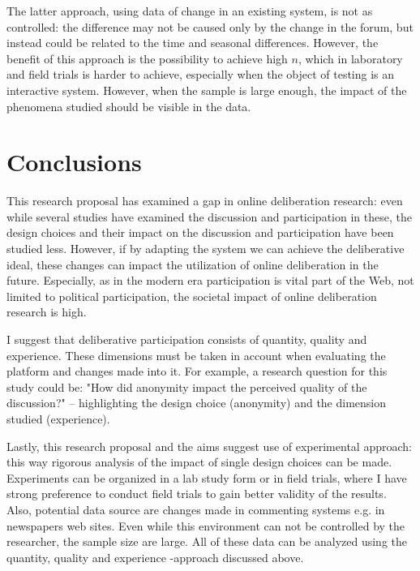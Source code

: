 \documentclass{article}
\begin{document}
The latter approach, using data of change in an existing system, is not as controlled: the difference may not be caused only by the change in the forum, but instead could be related to the time and seasonal differences. However, the benefit of this approach is the possibility to achieve high $n$, which in laboratory and field trials is harder to achieve, especially when the object of testing is an interactive system. However, when the sample is large enough, the impact of the phenomena studied should be visible in the data.

\section{Conclusions}

This research proposal has examined a gap in online deliberation research: even while several studies have examined the discussion and participation in these, the design choices and their impact on the discussion and participation have been studied less. However, if by adapting the system we can achieve the deliberative ideal, these changes can impact the utilization of online deliberation in the future. Especially, as in the modern era participation is vital part of the Web, not limited to political participation, the societal impact of online deliberation research is high.

I suggest that deliberative participation consists of quantity, quality and experience. These dimensions must be taken in account when evaluating the platform and changes made into it. For example, a research question for this study could be: "How did anonymity impact the perceived quality of the discussion?" -- highlighting the design choice (anonymity) and the dimension studied (experience).

Lastly, this research proposal and the aims suggest use of experimental approach: this way rigorous analysis of the impact of single design choices can be made. Experiments can be organized in a lab study form or in field trials, where I have strong preference to conduct field trials to gain better validity of the results. Also, potential data source are changes made in commenting systems e.g. in newspapers web sites. Even while this environment can not be controlled by the researcher, the sample size are large. All of these data can be analyzed using the quantity, quality and experience -approach discussed above.

\newpage


\begin{small}

\end{small}
\end{document}
